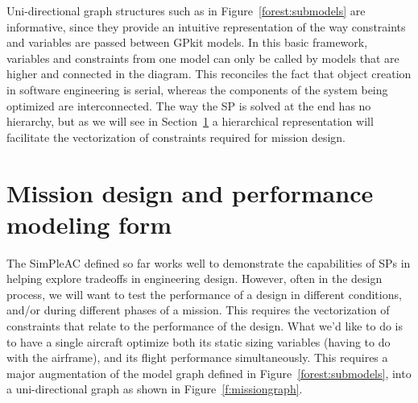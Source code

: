 Uni-directional graph structures such as in Figure~\ref{forest:submodels} are informative, since
they provide an intuitive representation of the way constraints and variables
are passed between GPkit models. In this basic framework,
variables and constraints from one model can only be called by models that are higher and connected in
the diagram. This reconciles the fact that object creation in software engineering is serial, whereas
the components of the system being optimized are interconnected. The way the \gls{SP} is solved at the end has no
hierarchy, but as we will see in Section~\ref{s:mission} a hierarchical representation
will facilitate the vectorization of constraints required for mission design.


\section{Mission design and performance modeling form}
\label{s:mission}

The SimPleAC defined so far works well to demonstrate the
capabilities of \gls{SP}s in helping explore tradeoffs in engineering design.
However, often in the design process, we will want to test the performance of a
design in different conditions, and/or during different phases of a mission.
This requires the vectorization of
constraints that relate to the performance of the design. What we'd like to do
is to have a single aircraft optimize both its static sizing variables (having
to do with the airframe), and its flight performance simultaneously. This requires a major
augmentation of the model graph defined in Figure~\ref{forest:submodels}, into a
uni-directional graph as shown in Figure~\ref{f:missiongraph}.


